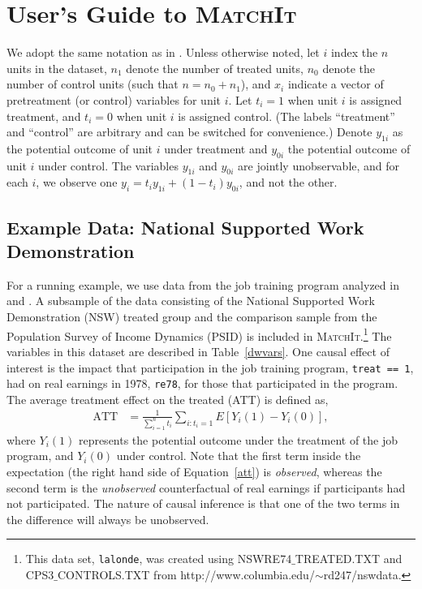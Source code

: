 \documentclass[oneside,letterpaper,titlepage]{article}
\newcommand{\MatchIt}{\textsc{MatchIt}}
\begin{document}
\section{User's Guide to \MatchIt}
\label{methods}

We adopt the same notation as in \citet*{HoImaKin05}. Unless otherwise
noted, let $i$ index the $n$ units in the dataset, $n_1$ denote the
number of treated units, $n_0$ denote the number of control units
(such that $n=n_0+n_1$), and $x_i$ indicate a vector of pretreatment
(or control) variables for unit $i$.  Let $t_i=1$ when unit $i$ is
assigned treatment, and $t_i=0$ when unit $i$ is assigned control.
(The labels ``treatment'' and ``control'' are arbitrary and can be
switched for convenience.)  Denote $y_{1i}$ as the potential outcome
of unit $i$ under treatment and $y_{0i}$ the potential outcome of unit
$i$ under control.  The variables $y_{1i}$ and $y_{0i}$ are jointly
unobservable, and for each $i$, we observe one
$y_i=t_iy_{1i}+(1-t_i)y_{0i}$, and not the other.


\subsection{Example Data: National Supported Work Demonstration}
\label{subsec:lalonde}

For a running example, we use data from the job training program
analyzed in \citet{lalonde86} and \citet{DehWah99}.  A subsample of
the data consisting of the National Supported Work Demonstration (NSW)
treated group and the comparison sample from the Population Survey of
Income Dynamics (PSID) is included in \MatchIt.\footnote{This data set, \texttt{lalonde},
was created using NSWRE74$\_$TREATED.TXT and CPS3$\_$CONTROLS.TXT from
http://www.columbia.edu/$\sim$rd247/nswdata.}  The variables in this
dataset are described in Table~\ref{dwvars}.  One causal effect of
interest is the impact that participation in the job training program,
\texttt{treat == 1}, had on real earnings in 1978, \texttt{re78}, for
those that participated in the program.  The average treatment effect
on the treated (ATT) is defined as,
\begin{align}
  \label{att}
  \text{ATT} & = \frac{1}{\sum_{i=1}^n t_i}\sum_{i:t_i=1} E[Y_i(1) - Y_i(0)],
\end{align}
where $Y_i(1)$ represents the potential outcome under the treatment of
the job program, and $Y_i(0)$ under control.  Note that the first term
inside the expectation (the right hand side of Equation~\ref{att}) is
\emph{observed}, whereas the second term is the \emph{unobserved}
counterfactual of real earnings if participants had not participated.
The nature of causal inference is that one of the two terms in the
difference will always be unobserved.  
\end{document}

